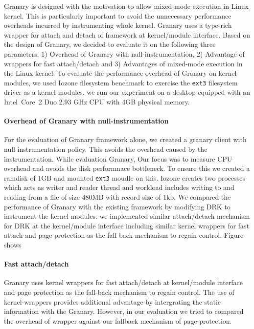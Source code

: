 Granary is designed with the motivation to allow mixed-mode execution in Linux kernel. This is particularly important to avoid the unnecessary performance overheads incurred by instrumenting whole kernel. Granary uses a type-rich wrapper for attach and detach of framework at kernel/module interface. Based on the design of Granary, we decided to evaluate it on the following three parameters: 1) Overhead of Granary with null-instrumentation, 2) Advantage of wrappers for fast attach/detach and 3) Advantages of mixed-mode execution in the Linux kernel. 
To evaluate the performance overhead of Granary on kernel modules, we used Iozone filesystem benchmark to exercise the \texttt{ext3} filesystem driver as a kernel modules. we run our experiment on a desktop equipped with an Intel\textregistered\ Core\texttrademark\ 2 Duo 2.93 GHz CPU with 4GB physical memory. 


\paragraph{Overhead of Granary with null-instrumentation} For the evaluation of Granary framework alone, we created a granary client with null instrumentation policy. This avoids the overhead caused by the instrumentation. While evaluation Granary, Our focus was to measure CPU overhead and avoids the disk performnace bottleneck. To ensure this we created a ramdisk of 1GB and mounted \texttt{ext3} moudle on this. Iozone creates two processes which acts as writer and reader thread and workload includes writing to and reading from a file of size 480MB with record size of 1kb. We compared the performance of Granary with the existing framework by modifying DRK to instrument the kernel modules.  we implemented similar attach/detach mechanism for DRK at the kernel/module interface including similar kernel wrappers for fast attach and page protection as the fall-back mechanism to regain control. Figure shows 

\paragraph{Fast attach/detach} Granary uses kernel wrappers for fast attach/detach at kernel/module interface and page protection as the fall-back mechanism to regain control. The use of kernel-wrappers provides additional advantage by intergrating the static information with the Granary. However, in our evaluation we tried to compared the overhead of wrapper against our fallback mechanism of page-protection.  


